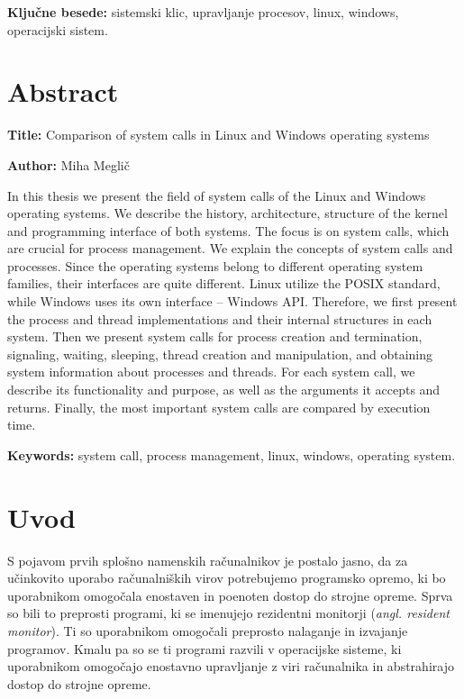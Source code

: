 \documentclass[a4paper,12pt,openright]{book}
\newcommand{\ttitleEn}{Comparison of system calls in Linux and Windows operating systems}
\newcommand{\tauthor}{Miha Meglič}
\newcommand{\tkeywords}{sistemski klic, upravljanje procesov, linux, windows, operacijski sistem}
\newcommand{\tkeywordsEn}{system call, process management, linux, windows, operating system}
\newcommand{\clearemptydoublepage}{\newpage{\pagestyle{empty}\cleardoublepage}}
\begin{document}
\bigskip

\noindent\textbf{Ključne besede:} \tkeywords.
\clearemptydoublepage

\chapter*{Abstract}

\noindent\textbf{Title:} \ttitleEn
\bigskip

\noindent\textbf{Author:} \tauthor
\bigskip

\noindent In this thesis we present the field of system calls of the Linux and Windows operating systems.
We describe the history, architecture, structure of the kernel and programming interface of both systems.
The focus is on system calls, which are crucial for process management.
We explain the concepts of system calls and processes.
Since the operating systems belong to different operating system families, their interfaces are quite different.
Linux utilize the POSIX standard, while Windows uses its own interface -- Windows API.
Therefore, we first present the process and thread implementations and their internal structures in each system.
Then we present system calls for process creation and termination, signaling, waiting, sleeping, thread creation and manipulation, and obtaining system information about processes and threads.
For each system call, we describe its functionality and purpose, as well as the arguments it accepts and returns.
Finally, the most important system calls are compared by execution time.

\bigskip

\noindent\textbf{Keywords:} \tkeywordsEn.
\clearemptydoublepage

\mainmatter
\setcounter{page}{1}
\pagestyle{fancy}

\chapter{Uvod}

S pojavom prvih splošno namenskih računalnikov je postalo jasno, da za učinkovito uporabo računalniških virov potrebujemo programsko opremo, ki bo uporabnikom omogočala enostaven in poenoten dostop do strojne opreme.
Sprva so bili to preprosti programi, ki se imenujejo rezidentni monitorji (\textit{angl. resident monitor}).
Ti so uporabnikom omogočali preprosto nalaganje in izvajanje programov.
Kmalu pa so se ti programi razvili v operacijske sisteme, ki uporabnikom omogočajo enostavno upravljanje z viri računalnika in abstrahirajo dostop do strojne opreme.
\end{document}
